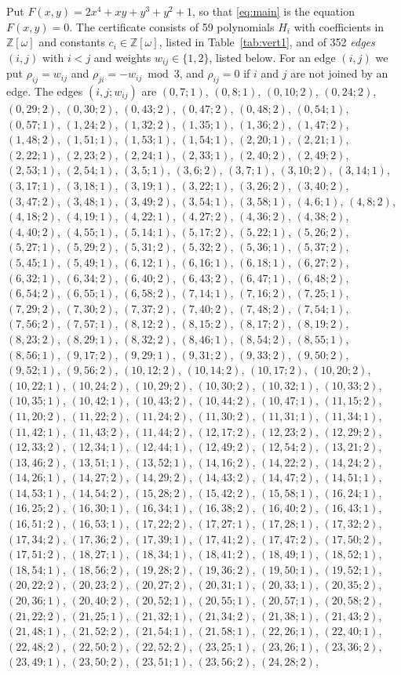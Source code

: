 \documentclass[11pt]{article}
\newcommand{\Z}{\mathbb{Z}}
\begin{document}
Put $F(x,y)=2x^{4}+xy+y^{3}+y^{2}+1$, so that \eqref{eq:main} is the equation $F(x,y)=0$. The certificate consists of 59 polynomials $H_i$ with coefficients in $\Z[\omega]$ and constants $c_i\in\Z[\omega]$, listed in Table~\ref{tab:vert1}, and of 352 \emph{edges} $(i,j)$ with $i<j$ and weights $w_{ij}\in\{1,2\}$, listed below. For an edge $(i,j)$ we put $\rho_{ij}=w_{ij}$ and $\rho_{ji}=-w_{ij}\bmod 3$, and $\rho_{ij}=0$ if $i$ and $j$ are not joined by an edge.
The edges $(i,j;w_{ij})$ are $(0,7;1)$, $(0,8;1)$, $(0,10;2)$, $(0,24;2)$, $(0,29;2)$, $(0,30;2)$, $(0,43;2)$, $(0,47;2)$, $(0,48;2)$, $(0,54;1)$, $(0,57;1)$, $(1,24;2)$, $(1,32;2)$, $(1,35;1)$, $(1,36;2)$, $(1,47;2)$, $(1,48;2)$, $(1,51;1)$, $(1,53;1)$, $(1,54;1)$, $(2,20;1)$, $(2,21;1)$, $(2,22;1)$, $(2,23;2)$, $(2,24;1)$, $(2,33;1)$, $(2,40;2)$, $(2,49;2)$, $(2,53;1)$, $(2,54;1)$, $(3,5;1)$, $(3,6;2)$, $(3,7;1)$, $(3,10;2)$, $(3,14;1)$, $(3,17;1)$, $(3,18;1)$, $(3,19;1)$, $(3,22;1)$, $(3,26;2)$, $(3,40;2)$, $(3,47;2)$, $(3,48;1)$, $(3,49;2)$, $(3,54;1)$, $(3,58;1)$, $(4,6;1)$, $(4,8;2)$, $(4,18;2)$, $(4,19;1)$, $(4,22;1)$, $(4,27;2)$, $(4,36;2)$, $(4,38;2)$, $(4,40;2)$, $(4,55;1)$, $(5,14;1)$, $(5,17;2)$, $(5,22;1)$, $(5,26;2)$, $(5,27;1)$, $(5,29;2)$, $(5,31;2)$, $(5,32;2)$, $(5,36;1)$, $(5,37;2)$, $(5,45;1)$, $(5,49;1)$, $(6,12;1)$, $(6,16;1)$, $(6,18;1)$, $(6,27;2)$, $(6,32;1)$, $(6,34;2)$, $(6,40;2)$, $(6,43;2)$, $(6,47;1)$, $(6,48;2)$, $(6,54;2)$, $(6,55;1)$, $(6,58;2)$, $(7,14;1)$, $(7,16;2)$, $(7,25;1)$, $(7,29;2)$, $(7,30;2)$, $(7,37;2)$, $(7,40;2)$, $(7,48;2)$, $(7,54;1)$, $(7,56;2)$, $(7,57;1)$, $(8,12;2)$, $(8,15;2)$, $(8,17;2)$, $(8,19;2)$, $(8,23;2)$, $(8,29;1)$, $(8,32;2)$, $(8,46;1)$, $(8,54;2)$, $(8,55;1)$, $(8,56;1)$, $(9,17;2)$, $(9,29;1)$, $(9,31;2)$, $(9,33;2)$, $(9,50;2)$, $(9,52;1)$, $(9,56;2)$, $(10,12;2)$, $(10,14;2)$, $(10,17;2)$, $(10,20;2)$, $(10,22;1)$, $(10,24;2)$, $(10,29;2)$, $(10,30;2)$, $(10,32;1)$, $(10,33;2)$, $(10,35;1)$, $(10,42;1)$, $(10,43;2)$, $(10,44;2)$, $(10,47;1)$, $(11,15;2)$, $(11,20;2)$, $(11,22;2)$, $(11,24;2)$, $(11,30;2)$, $(11,31;1)$, $(11,34;1)$, $(11,42;1)$, $(11,43;2)$, $(11,44;2)$, $(12,17;2)$, $(12,23;2)$, $(12,29;2)$, $(12,33;2)$, $(12,34;1)$, $(12,44;1)$, $(12,49;2)$, $(12,54;2)$, $(13,21;2)$, $(13,46;2)$, $(13,51;1)$, $(13,52;1)$, $(14,16;2)$, $(14,22;2)$, $(14,24;2)$, $(14,26;1)$, $(14,27;2)$, $(14,29;2)$, $(14,43;2)$, $(14,47;2)$, $(14,51;1)$, $(14,53;1)$, $(14,54;2)$, $(15,28;2)$, $(15,42;2)$, $(15,58;1)$, $(16,24;1)$, $(16,25;2)$, $(16,30;1)$, $(16,34;1)$, $(16,38;2)$, $(16,40;2)$, $(16,43;1)$, $(16,51;2)$, $(16,53;1)$, $(17,22;2)$, $(17,27;1)$, $(17,28;1)$, $(17,32;2)$, $(17,34;2)$, $(17,36;2)$, $(17,39;1)$, $(17,41;2)$, $(17,47;2)$, $(17,50;2)$, $(17,51;2)$, $(18,27;1)$, $(18,34;1)$, $(18,41;2)$, $(18,49;1)$, $(18,52;1)$, $(18,54;1)$, $(18,56;2)$, $(19,28;2)$, $(19,36;2)$, $(19,50;1)$, $(19,52;1)$, $(20,22;2)$, $(20,23;2)$, $(20,27;2)$, $(20,31;1)$, $(20,33;1)$, $(20,35;2)$, $(20,36;1)$, $(20,40;2)$, $(20,52;1)$, $(20,55;1)$, $(20,57;1)$, $(20,58;2)$, $(21,22;2)$, $(21,25;1)$, $(21,32;1)$, $(21,34;2)$, $(21,38;1)$, $(21,43;2)$, $(21,48;1)$, $(21,52;2)$, $(21,54;1)$, $(21,58;1)$, $(22,26;1)$, $(22,40;1)$, $(22,48;2)$, $(22,50;2)$, $(22,52;2)$, $(23,25;1)$, $(23,26;1)$, $(23,36;2)$, $(23,49;1)$, $(23,50;2)$, $(23,51;1)$, $(23,56;2)$, $(24,28;2)$, 
\end{document}

